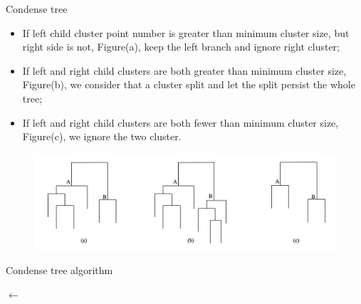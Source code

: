 \documentclass{beamer}
\begin{document}
\begin{frame}{Condense tree}
\begin{itemize}
	\item If left child cluster point number is greater than minimum cluster size, but right side is not, Figure(a), keep the left branch and ignore right cluster;
	\item If left and right child clusters are both greater than minimum cluster size, Figure(b), we consider that a cluster split and let the split persist the whole tree;
	\item If left and right child clusters are both fewer than minimum cluster size, Figure(c), we ignore the two cluster.
\end{itemize}
\begin{figure}[h!]
	\centering
	\includegraphics[scale=0.45]{b.png}
\end{figure}
\end{frame}

\begin{frame}{Condense tree algorithm}
\tiny
\begin{algorithm}[H]
	\SetAlgoNoLine
	\nodeList $\leftarrow$ \;
\end{algorithm}
\end{frame}
\end{document}
